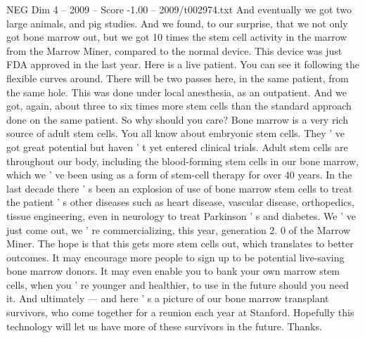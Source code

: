 \begin{textsample}{NEG Dim 4 – 2009 – Score -1.00 – 2009/t002974.txt}
And eventually we got two large animals, and pig studies.
And we found, to our surprise, that we not only got bone marrow out, but we got 10 times the stem cell activity in the marrow from the Marrow Miner, compared to the normal device.
This device was just FDA approved in the last year.
Here is a live patient.
You can see it following the flexible curves around.
There will be two passes here, in the same patient, from the same hole.
This was done under local anesthesia, as an outpatient.
And we got, again, about three to six times more stem cells than the standard approach done on the same patient.
So why should you care?
Bone marrow is a very rich source of adult stem cells.
You all know about embryonic stem cells.
They ' ve got great potential but haven ' t yet entered clinical trials.
Adult stem cells are throughout our body, including the blood-forming stem cells in our bone marrow, which we ' ve been using as a form of stem-cell therapy for over 40 years.
In the last decade there ' s been an explosion of use of bone marrow stem cells to treat the patient ' s other diseases such as heart disease, vascular disease, orthopedics, tissue engineering, even in neurology to treat Parkinson ' s and diabetes.
We ' ve just come out, we ' re commercializing, this year, generation 2. 0 of the Marrow Miner.
The hope is that this gets more stem cells out, which translates to better outcomes.
It may encourage more people to sign up to be potential live-saving bone marrow donors.
It may even enable you to bank your own marrow stem cells, when you ' re younger and healthier, to use in the future should you need it.
And ultimately — and here ' s a picture of our bone marrow transplant survivors, who come together for a reunion each year at Stanford.
Hopefully this technology will let us have more of these survivors in the future.
Thanks.

\end{textsample}
